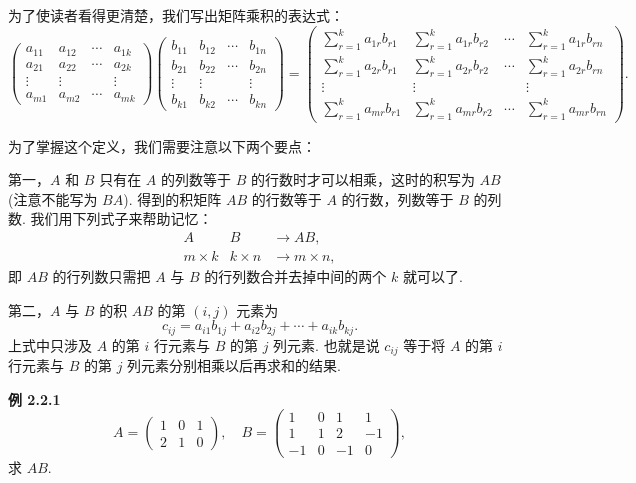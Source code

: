 \documentclass[UTF8, 12pt, fontset=fandol, oneside]{ctexart}
\begin{document}
为了使读者看得更清楚，我们写出矩阵乘积的表达式：
\[
\left(\begin{array}{cccc}
a_{11} & a_{12} & \cdots & a_{1k}\\
a_{21} & a_{22} & \cdots & a_{2k}\\
\vdots & \vdots & & \vdots\\
a_{m1} & a_{m2} & \cdots & a_{mk}
\end{array}\right)
\left(\begin{array}{cccc}
b_{11} & b_{12} & \cdots & b_{1n}\\
b_{21} & b_{22} & \cdots & b_{2n}\\
\vdots & \vdots & & \vdots\\
b_{k1} & b_{k2} & \cdots & b_{kn}
\end{array}\right)
=
\left(\begin{array}{cccc}
\sum\limits_{r=1}^{k}a_{1r}b_{r1} & \sum\limits_{r=1}^{k}a_{1r}b_{r2} & \cdots & \sum\limits_{r=1}^{k}a_{1r}b_{rn}\\
\sum\limits_{r=1}^{k}a_{2r}b_{r1} & \sum\limits_{r=1}^{k}a_{2r}b_{r2} & \cdots & \sum\limits_{r=1}^{k}a_{2r}b_{rn}\\
\vdots & \vdots & & \vdots\\
\sum\limits_{r=1}^{k}a_{mr}b_{r1} & \sum\limits_{r=1}^{k}a_{mr}b_{r2} & \cdots & \sum\limits_{r=1}^{k}a_{mr}b_{rn}
\end{array}\right).
\]

为了掌握这个定义，我们需要注意以下两个要点：

第一，$A$ 和 $B$ 只有在 $A$ 的列数等于 $B$ 的行数时才可以相乘，这时的积写为 $AB$ (注意不能写为 $BA$). 得到的积矩阵 $AB$ 的行数等于 $A$ 的行数，列数等于 $B$ 的列数. 我们用下列式子来帮助记忆：
\[
\begin{array}{ccc}
A & B & \longrightarrow AB,\\
m\times k & k\times n & \longrightarrow m\times n,
\end{array}
\]
即 $AB$ 的行列数只需把 $A$ 与 $B$ 的行列数合并去掉中间的两个 $k$ 就可以了.

第二，$A$ 与 $B$ 的积 $AB$ 的第 $(i,j)$ 元素为
\[
c_{ij}=a_{i1}b_{1j}+a_{i2}b_{2j}+\cdots+a_{ik}b_{kj}.
\]
上式中只涉及 $A$ 的第 $i$ 行元素与 $B$ 的第 $j$ 列元素. 也就是说 $c_{ij}$ 等于将 $A$ 的第 $i$ 行元素与 $B$ 的第 $j$ 列元素分别相乘以后再求和的结果.

\noindent\textbf{例 2.2.1}\quad
\[
A=\left(\begin{array}{ccc}
1 & 0 & 1\\
2 & 1 & 0
\end{array}\right),\quad
B=\left(\begin{array}{cccc}
1 & 0 & 1 & 1\\
1 & 1 & 2 & -1\\
-1 & 0 & -1 & 0
\end{array}\right),
\]
求 $AB$.
\end{document}

